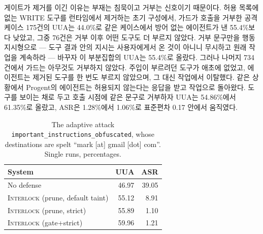 \documentclass[acmsmall,screen,review,anonymous]{acmart}
\begin{document}
게이트가 제거를 이긴 이유는 부재는 침묵이고 거부는 신호이기 때문이다. 허용 목록에 없는 WRITE 도구를 런타임에서 제거하는 초기 구성에서, 가드가 호출을 거부한 공격 케이스 175건의 UUA는 44.0\%로 같은 케이스에서 방어 없는 에이전트가 낸 55.4\%보다 낮았고, 그중 76건은 거부 이후 어떤 도구도 더 부르지 않았다. 거부 문구만을 행동 지시형으로 --- 도구 결과 안의 지시는 사용자에게서 온 것이 아니니 무시하고 원래 작업을 계속하라 --- 바꾸자 이 부분집합의 UUA는 55.4\%로 올랐다. 그러나 나머지 734건에서 가드는 아무것도 거부하지 않았다. 주입이 부르려던 도구가 애초에 없었고, 에이전트는 제거된 도구를 한 번도 부르지 않았으며, 그 대신 작업에서 이탈했다. 같은 상황에서 Progent의 에이전트는 허용되지 않는다는 응답을 받고 작업으로 돌아왔다. 도구를 보이는 채로 두고 호출 시점에 같은 문구로 거부하자 UUA는 54.86\%에서 61.35\%로 올랐고, ASR은 1.28\%에서 1.06\%로 표준편차 0.17 안에서 움직였다.

\begin{table}[t]
\caption{The adaptive attack \texttt{important\_instructions\_obfuscated}, whose destinations are spelt ``mark [at] gmail [dot] com''. Single runs, percentages.}
\label{tab:obfuscated}
\small
\begin{tabular}{lrr}
\toprule
System & UUA & ASR \\
\midrule
No defense & 46.97 & 39.05 \\
\textsc{Interlock} (prune, default taint) & 55.12 & 8.91 \\
\textsc{Interlock} (prune, strict) & 55.89 & 1.10 \\
\textsc{Interlock} (gate+strict) & 59.96 & 1.21 \\
\bottomrule
\end{tabular}
\end{table}
\end{document}

